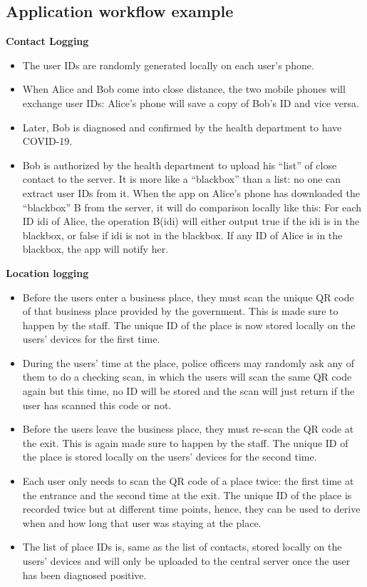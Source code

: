   \subsection{Application workflow example}
    \vspace{0.25cm}
    \par \textbf{Contact Logging}
    \vspace{0.25cm}
    \begin{itemize}
      \item The user IDs are randomly generated locally on each user’s phone.
      \item When Alice and Bob come into close distance, the two mobile phones will exchange user IDs: Alice’s phone will save a copy of Bob’s ID and vice versa.
      \item Later, Bob is diagnosed and confirmed by the health department to have COVID-19.
      \item Bob is authorized by the health department to upload his “list” of close contact to the server. It is more like a “blackbox” than a list: no one can extract user IDs from it. When the app on Alice’s phone has downloaded the “blackbox” B from the server, it will do comparison locally like this: For each ID idi of Alice, the operation B(idi) will either output true if the idi is in the blackbox, or false if idi is not in the blackbox. If any ID of Alice is in the blackbox, the app will notify her.
    \end{itemize}      

    \vspace{0.25cm}
    \par \textbf{Location logging}
    \vspace{0.25cm}
    \begin{itemize}
      \item Before the users enter a business place, they must scan the unique QR code of that business place provided by the government. This is made sure to happen by the staff. The unique ID of the place is now stored locally on the users' devices for the first time.
      \item During the users' time at the place, police officers may randomly ask any of them to do a checking scan, in which the users will scan the same QR code again but this time, no ID will be stored and the scan will just return if the user has scanned this code or not.
      \item Before the users leave the business place, they must re-scan the QR code at the exit. This is again made sure to happen by the staff. The unique ID of the place is stored locally on the users' devices for the second time.
      \item Each user only needs to scan the QR code of a place twice: the first time at the entrance and the second time at the exit. The unique ID of the place is recorded twice but at different time points, hence, they can be used to derive when and how long that user was staying at the place. 
      \item The list of place IDs is, same as the list of contacts, stored locally on the users' devices and will only be uploaded to the central server once the user has been diagnosed positive. 
    \end{itemize}

